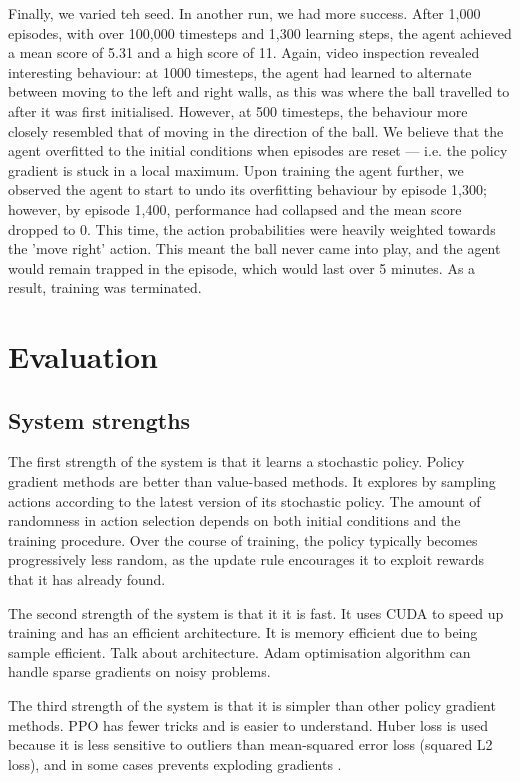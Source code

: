 \documentclass[12pt,a4paper]{article}
\begin{document}
Finally, we varied teh seed. In another run, we had more success. After 1,000 episodes, with over 100,000 timesteps and 1,300 learning steps, the agent achieved a mean score of 5.31 and a high score of 11. Again, video inspection revealed interesting behaviour: at 1000 timesteps, the agent had learned to alternate between moving to the left and right walls, as this was where the ball travelled to after it was first initialised. However, at 500 timesteps, the behaviour more closely resembled that of moving in the direction of the ball. We believe that the agent overfitted to the initial conditions when episodes are reset --- i.e. the policy gradient is stuck in a local maximum. Upon training the agent further, we observed the agent to start to undo its overfitting behaviour by episode 1,300; however, by episode 1,400, performance had collapsed and the mean score dropped to 0. This time, the action probabilities were heavily weighted towards the 'move right' action. This meant the ball never came into play, and the agent would remain trapped in the episode, which would last over 5 minutes. As a result, training was terminated. 

\section{Evaluation}
\subsection{System strengths} 
The first strength of the system is that it learns a stochastic policy. Policy gradient methods are better than value-based methods. It explores by sampling actions according to the latest version of its stochastic policy. The amount of randomness in action selection depends on both initial conditions and the training procedure. Over the course of training, the policy typically becomes progressively less random, as the update rule encourages it to exploit rewards that it has already found. 

The second strength of the system is that it it is fast. It uses CUDA to speed up training and has an efficient architecture. It is memory efficient due to being sample efficient. Talk about architecture. Adam optimisation algorithm \cite{kingma2017adam} can handle sparse gradients on noisy problems.

The third strength of the system is that it is simpler than other policy gradient methods. PPO has fewer tricks and is easier to understand. Huber loss is used because it is less sensitive to outliers than mean-squared error loss (squared L2 loss), and in some cases prevents exploding gradients \cite{DBLP:journals/corr/Girshick15}.
\end{document}
